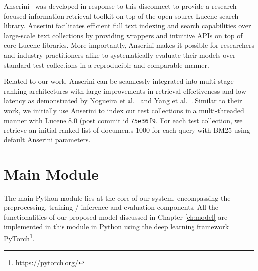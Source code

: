 Anserini~\cite{Yang_etal_SIGIR2017, Yang_etal_JDIQ2018} was developed in response to this disconnect to provide a research-focused information retrieval toolkit on top of the open-source Lucene search library.
Anserini facilitates efficient full text indexing and search capabilities over large-scale text collections by providing wrappers and intuitive APIs on top of core Lucene libraries.
More importantly, Anserini makes it possible for researchers and industry practitioners alike to systematically evaluate their models over standard test collections in a reproducible and comparable manner.

Related to our work, Anserini can be seamlessly integrated into multi-stage ranking architectures with large improvements in retrieval effectiveness and low latency as demonstrated by Nogueira et al.~\cite{nogueira2019passage} and Yang et al.~\cite{Yang_etal_arXiv2019}.
Similar to their work, we initially use Anserini to index our test collections in a multi-threaded manner with Lucene 8.0 (post commit id \texttt{75e36f9}.
For each test collection, we retrieve an initial ranked list of documents 1000 for each query with BM25 using default Anserini parameters.


\section{Main Module}

The main Python module lies at the core of our system, encompassing the preprocessing, training / inference and evaluation components.
All the functionalities of our proposed model discussed in Chapter \ref{ch:model} are implemented in this module in Python using the deep learning framework PyTorch\footnote{https://pytorch.org/}.

